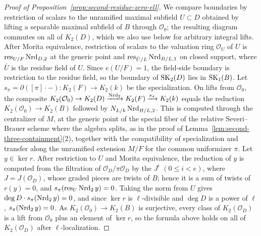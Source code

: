 \begin{proof}[Proof of Proposition~\ref{prop:second-residue-zero-ell}]
We compare boundaries by restriction of scalars to the unramified maximal subfield $U\subset D$ obtained by lifting a separable maximal subfield of $B$ through $\mathcal O_0$; the resulting diagram commutes on all of $K_2(D)$, which we also use below for arbitrary integral lifts.
After Morita equivalence, restriction of scalars to the valuation ring $\mathcal O_U$ of $U$ is $\operatorname{res}_{U/F}\operatorname{Nrd}_{D,2}$ at the generic point and $\operatorname{res}_{\bar U/L}\operatorname{Nrd}_{B/L,1}$ on closed support, where $\bar U$ is the residue field of $U$.
Since $e(U/F)=1$, the field-side boundary is restriction to the residue field, so the boundary of $\operatorname{SK}_2(D)$ lies in $\operatorname{SK}_1(B)$.
Let $s_\pi=\partial([\pi]\cdot-)\colon K_2(F)\to K_2(k)$ be the specialization.
On lifts from $\mathcal O_0$, the composite $K_2(\mathcal O_0)\to K_2(D)\xrightarrow{\operatorname{Nrd}_2}K_2(F)\xrightarrow{s_\pi}K_2(k)$ equals the reduction $K_2(\mathcal O_0)\to K_2(B)$ followed by $N_{L/k}\operatorname{Nrd}_{B/L,2}$.
This is computed through the centralizer of $M$, at the generic point of the special fiber of the relative Severi--Brauer scheme where the algebra splits, as in the proof of Lemma~\ref{lem:second-three-containment}(2), together with the compatibility of specialization and transfer along the unramified extension $M/F$ for the common uniformizer $\pi$.
Let $y\in\ker r$.
After restriction to $U$ and Morita equivalence, the reduction of $y$ is computed from the filtration of $\mathcal O_D/\pi\mathcal O_D$ by the $J^i$ $(0\le i<e)$, where $J=J(\mathcal O_D)$, whose graded pieces are twists of $B$; hence it is a sum of twists of $r(y)=0$, and $s_\pi(\operatorname{res}_U\operatorname{Nrd}_2y)=0$.
Taking the norm from $U$ gives $\deg D\cdot s_\pi(\operatorname{Nrd}_2y)=0$, and since $\ker r$ is $\ell$-divisible and $\deg D$ is a power of $\ell$, $s_\pi(\operatorname{Nrd}_2y)=0$.
As $K_2(\mathcal O_0)\to K_2(B)$ is surjective, every class of $K_2(\mathcal O_D)$ is a lift from $\mathcal O_0$ plus an element of $\ker r$, so the formula above holds on all of $K_2(\mathcal O_D)$ after $\ell$-localization.


\end{proof}
